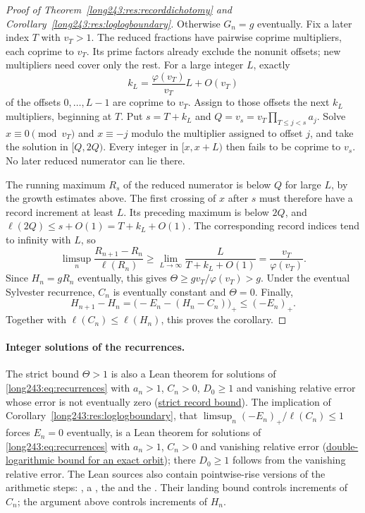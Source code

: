\documentclass[11pt]{article}
\newcommand{\latecommit}{168bf6727758f918a430ef056a1c93d3160b53a6}
\newcommand{\laterepobase}{https://github.com/wcook04/plectis-erdos/blob/\latecommit}
\begin{document}
\begin{proof}[Proof of Theorem~\ref{long243:res:recorddichotomy} and
Corollary~\ref{long243:res:loglogboundary}]
Otherwise $G_n=g$ eventually. Fix a later index $T$ with $v_T>1$.
The reduced fractions have pairwise coprime multipliers, each coprime
to $v_T$. Its prime factors already exclude the nonunit offsets;
new multipliers need cover only the rest. For a large integer $L$, exactly
\[
 k_L=\frac{\varphi(v_T)}{v_T}L+O(v_T)
\]
of the offsets $0,\ldots,L-1$ are coprime to $v_T$.
Assign to those offsets the next $k_L$ multipliers, beginning at $T$.
Put $s=T+k_L$ and $Q=v_s=v_T\prod_{T\le j<s}a_j$.
Solve $x\equiv0\pmod{v_T}$ and $x\equiv-j$ modulo the multiplier
assigned to offset $j$, and take the solution in $[Q,2Q)$.
Every integer in $[x,x+L)$ then fails to be coprime to $v_s$.
No later reduced numerator can lie there.

The running maximum $R_s$ of the reduced numerator is below $Q$ for
large $L$, by the growth estimates above. The first crossing of $x$
after $s$ must therefore have a record increment at least $L$.
Its preceding maximum is below $2Q$, and
$\ell(2Q)\le s+O(1)=T+k_L+O(1)$. The corresponding record indices tend
to infinity with $L$, so
\[
 \limsup_n\frac{R_{n+1}-R_n}{\ell(R_n)}
 \ge\lim_{L\to\infty}\frac{L}{T+k_L+O(1)}
 =\frac{v_T}{\varphi(v_T)}.
\]
Since $H_n=gR_n$ eventually, this gives
$\Theta\ge g v_T/\varphi(v_T)>g$.
Under the eventual Sylvester recurrence, $C_n$ is eventually constant and $\Theta=0$.
Finally,
\[
 H_{n+1}-H_n=\bigl(-E_n-(H_n-C_n)\bigr)_+\le(-E_n)_+.
\]
Together with $\ell(C_n)\le\ell(H_n)$, this proves the corollary.
\end{proof}

\paragraph{Integer solutions of the recurrences.}
The strict bound $\Theta>1$ is also a Lean theorem for solutions of
\eqref{long243:eq:recurrences} with $a_n>1$, $C_n>0$, $D_0\ge1$ and vanishing relative error whose error
is not eventually zero
(\href{\laterepobase/lean/ErdosProblems/Erdos243/PaperCompleteR21/ExactOrbitRecordDichotomy.lean\#L363}{strict record bound}).
The implication of Corollary~\ref{long243:res:loglogboundary}, that
$\limsup_n(-E_n)_+/\ell(C_n)\le1$ forces $E_n=0$ eventually, is a Lean
theorem for solutions of \eqref{long243:eq:recurrences} with $a_n>1$,
$C_n>0$ and vanishing relative error
(\href{\laterepobase/lean/ErdosProblems/Erdos243/PaperCompleteR21/DoubleLogOrbitBound.lean\#L45}{double-logarithmic bound for an exact orbit});
there $D_0\ge1$ follows from the vanishing relative error.
The Lean sources also contain pointwise-rise versions of the arithmetic
steps:
, a
\lword{Erdos243/SlowRiseBarrier.lean}{51}{exists_consecutiveMultiples_between}{CRT
block starting in $[P,2P)$}, the
 and the
. Their landing bound controls increments of $C_n$; the
argument above controls increments of $H_n$.
\end{document}
